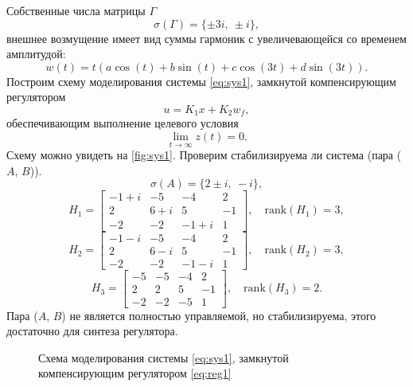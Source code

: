 Собственные числа матрицы $\Gamma$
\begin{equation*}
    \sigma(\Gamma)=\{\pm3i,\ \pm i\},
\end{equation*}
внешнее возмущение имеет вид суммы гармоник с увеличевающейся
со временем амплитудой:
\begin{equation*}
    w(t)=t(a\cos(t)+b\sin(t) + c\cos(3t)+d\sin(3t)).
\end{equation*}
Построим схему моделирования системы \eqref{eq:sys1},
замкнутой компенсирующим регулятором
\begin{equation}
    u=K_1x+K_2w_f,
    \label{eq:reg1}
\end{equation}
обеспечивающим выполнение целевого условия
\begin{equation*}
    \lim_{t\rightarrow\infty}z(t)=0.
\end{equation*}
Схему можно увидеть на \autoref{fig:sys1}.
Проверим стабилизируема ли система (пара ($A$, $B$)).
\begin{equation*}
    \sigma(A)=\{2\pm i,\ -i\},
\end{equation*}
\begin{equation*}
    H_1=\begin{bmatrix}
        -1 + i & -5 & -4 & 2 \\
        2 & 6 + i & 5 & -1 \\
        -2 & -2 & -1 + i & 1
    \end{bmatrix},\quad \text{rank}(H_1)=3,
\end{equation*}
\begin{equation*}
    H_2=\begin{bmatrix}
        -1 - i & -5 & -4 & 2 \\
        2 & 6 - i & 5 & -1 \\
        -2 & -2 & -1 - i & 1
    \end{bmatrix},\quad \text{rank}(H_2)=3,
\end{equation*}
\begin{equation*}
    H_3=\begin{bmatrix}
        -5 & -5 & -4 & 2 \\
        2 & 2 & 5 & -1 \\
        -2 & -2 & -5 & 1
    \end{bmatrix},\quad \text{rank}(H_3)=2.
\end{equation*}
Пара ($A$, $B$) не является полностью управляемой, но
стабилизируема, этого достаточно для синтеза регулятора.

\begin{figure}[H]
    \centering
    
    \caption{Схема моделирования системы \eqref{eq:sys1},
    замкнутой компенсирующим регулятором \eqref{eq:reg1}}
    \label{fig:sys1}
\end{figure}

